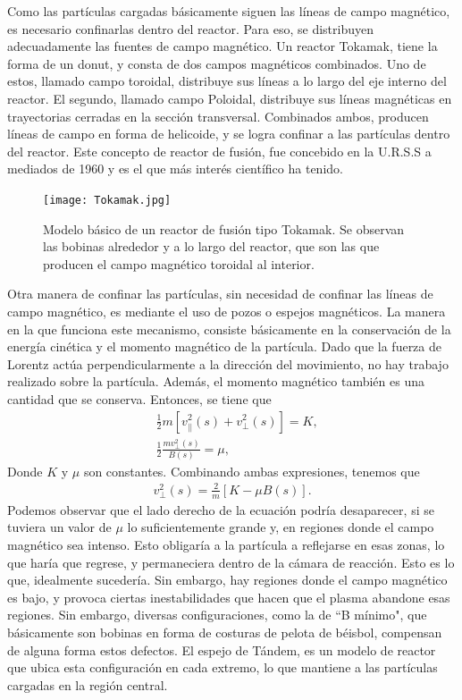 \documentclass[../main.tex]{subfiles}
\begin{document}
	    Como las partículas cargadas básicamente siguen las líneas de campo magnético, es necesario confinarlas dentro del reactor. Para eso, se distribuyen adecuadamente las fuentes de campo magnético. Un reactor Tokamak, tiene la forma de un donut, y consta de dos
        campos magnéticos combinados. Uno de estos, llamado campo toroidal, distribuye sus líneas a lo largo del eje interno del reactor. El segundo, llamado campo Poloidal, distribuye sus líneas magnéticas en  trayectorias cerradas en la sección transversal.  Combinados ambos, producen líneas de campo en forma de helicoide, y se logra confinar a las partículas
        dentro del reactor. Este concepto de reactor de fusión, fue concebido en la U.R.S.S a mediados de 1960 y es el que más interés 
        científico ha tenido. \\


        \begin{figure}[h]
        \centering
        \texttt{[image: Tokamak.jpg]}
        \caption{Modelo básico de un reactor de fusión tipo Tokamak. Se observan las bobinas alrededor y a lo largo del reactor, que son las que producen el campo magnético toroidal al interior.}
        \end{figure}

        Otra manera de confinar las partículas, sin necesidad de confinar las líneas de campo magnético, es mediante el uso de pozos o espejos
        magnéticos. La manera en la que funciona este mecanismo, consiste básicamente en la conservación de la energía cinética y el momento
        magnético de la partícula. Dado que la fuerza de Lorentz actúa perpendicularmente a la dirección del movimiento, no hay trabajo realizado
        sobre la partícula. Además, el momento magnético también es una cantidad que se conserva. Entonces, se tiene que 
        \begin{align}
        &\frac{1}{2}m[v^2_{||}(s) + v^2_\perp(s)] = K, \\
        &\frac{1}{2}\frac{mv^2_\perp(s)}{B(s)} = \mu,
        \end{align}
        Donde $K$ y $\mu$ son constantes. Combinando ambas expresiones, tenemos que
        \begin{align}
            v^2_\perp(s) = \frac{2}{m}[K-\mu B(s)].
        \end{align}
        Podemos observar que el lado derecho de la ecuación podría desaparecer, si se tuviera un valor de $\mu$ lo suficientemente grande y, 
        en regiones donde el campo magnético sea intenso. Esto obligaría a la partícula a reflejarse en esas zonas, lo que haría que regrese,
        y permaneciera dentro de la cámara de reacción. Esto es lo que, idealmente sucedería. Sin embargo, hay regiones donde el campo magnético
        es bajo, y provoca ciertas inestabilidades que hacen que el plasma abandone esas regiones. Sin embargo, diversas configuraciones,
        como la de ``B mínimo", que básicamente son bobinas en forma de costuras de pelota de béisbol, compensan de alguna forma estos defectos.
        El espejo de Tándem, es un modelo de reactor que ubica esta configuración en cada extremo, lo que mantiene a las partículas cargadas en la
        región central.
\end{document}
